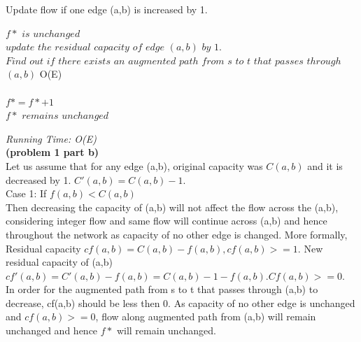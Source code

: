 	
	\begin{algorithm}[H]
	\caption{Update flow if one edge (a,b) is increased by 1.}
	\label{alg:alg_incr_by_1}
	\begin{algorithmic}
			\State $ f* $ $ is $ $ unchanged$ 	
		\EndIf
		\\
			\State $update $ $the $ $ residual $ $capacity $ $of $ $edge $ $(a,b) $ $by $ $1 $. \\
			\State $Find $ $out $ $if $ $there $ $exists $ $an $ $augmented $ $path $ $from $ $s $ $to $ $t $ $that $ $passes $ $through $ $(a,b) $ O(E)\\ 
			\\
			\State $f* = f* + 1$\\
			\Else
			\State $f* $ $remains $ $unchanged $
			\EndIf
		\EndIf
	  	
	  	
	\end{algorithmic}
	\end{algorithm}


\textit{Running Time: O(E)}
\\

\textbf{(problem 1 part b)	}
\\
	Let us assume that for any edge (a,b), original capacity was $C(a,b)$ and it is decreased by 1. $C'(a,b)= C(a,b) - 1$. \\
	Case 1: If $f(a,b) < C(a,b)$ \\
	Then decreasing the capacity of (a,b) will not affect the flow across the (a,b), considering integer flow and same flow will continue across (a,b) and hence throughout the network as capacity of no other edge is changed. More formally, \\
	Residual capacity $cf(a,b) = C(a,b) - f(a,b), cf(a,b) >= 1$. New residual capacity of (a,b)\\
					$cf'(a,b) = C'(a,b) - f(a,b) = C(a,b) - 1 - f(a,b). Cf(a,b) >=0$.\\
	In order for the augmented path from s to t that passes through (a,b) to decrease, cf(a,b) should be less then 0. As capacity of no other edge is unchanged and $cf(a,b) >= 0$, flow along augmented path from (a,b) will remain unchanged and hence $f*$ will remain unchanged. \\
	
